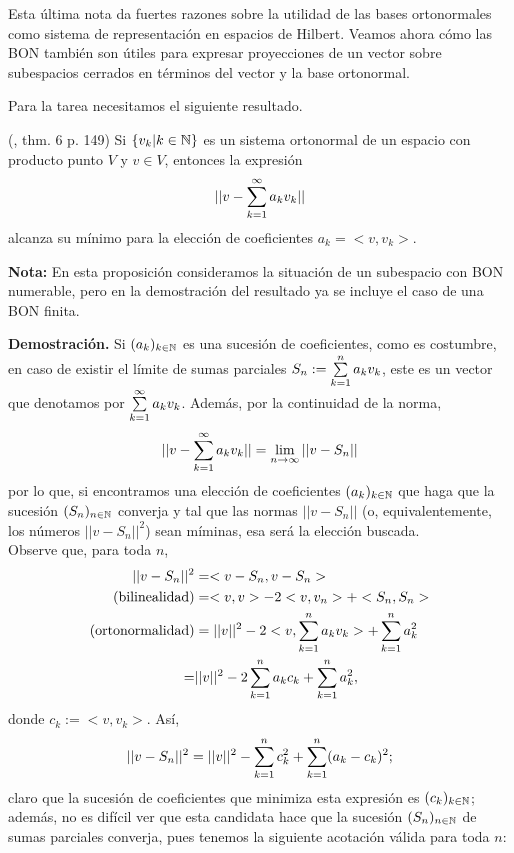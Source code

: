 Esta última nota da fuertes razones sobre la utilidad
de las bases ortonormales como sistema de representación
en espacios de Hilbert. Veamos ahora cómo
las BON también son útiles para expresar proyecciones
de un vector sobre subespacios cerrados en términos del
vector y la base ortonormal. 

Para la tarea necesitamos el siguiente resultado.


\begin{prop} \label{teo: Kol 6, p.149}
(\cite{kolmogorov}, thm. 6 p. 149)
Si $\{ v_{k} |k \in \mathbb{N} \}$ es un sistema
ortonormal de un espacio con producto
punto $V$ y $v \in V$, entonces la expresión
\[
|| v - \sum\limits_{k=1}^{\infty}a_{k}v_{k}  ||
\]
alcanza su mínimo para la elección de coeficientes
$a_{k}= <v , v_{k} > $.
\end{prop}

\noindent
\textbf{Nota:}
En esta proposición consideramos la situación de un subespacio
con BON numerable, pero en la demostración del resultado ya
se incluye el caso de una BON finita.

\noindent
\textbf{Demostración.}
Si $(a_{k})_{k \in \mathbb{N}}$ es una sucesión de coeficientes,
como es costumbre,
en caso de existir el límite de sumas parciales
$S_{n}:= \sum\limits_{k=1}^{n}a_{k}v_{k}$, este es un vector que denotamos
por $\sum\limits_{k=1}^{\infty}a_{k}v_{k}$. Además,
por la continuidad de la norma,
\[
||v - \sum\limits_{k=1}^{\infty}a_{k}v_{k} || = \lim\limits_{n \rightarrow \infty }{||v-S_{n}||}
\]
por lo que, si encontramos una elección de coeficientes $(a_{k})_{k \in \mathbb{N}}$
que haga que
la sucesión $(S_{n})_{n \in \mathbb{N}}$ converja y tal que las normas
$||v-S_{n}||$ (o, equivalentemente, los números $||v-S_{n}||^{2}$)
sean míminas, esa será la elección buscada. \\
Observe que, para toda $n$,
\begin{align*}
||v-S_{n}||^{2} & = <v-S_{n} , v-S_{n} > \\
\text{(bilinealidad)} & =  <v, v > - 2 < v , v_{n} > + <S_{n} , S_{n}  > \\
\text{(ortonormalidad)} & =  ||v||^{2} - 2 < v ,\sum\limits_{k=1}^{n}a_{k}v_{k} > + 
\sum\limits_{k=1}^{n}a_{k}^{2} \\
= & ||v||^{2} - 2\sum\limits_{k=1}^{n}a_{k}c_{k}  + 
\sum\limits_{k=1}^{n}a_{k}^{2},
\end{align*}
donde $c_{k}:= < v , v_{k} >$. Así,
\[
||v-S_{n}||^{2} = ||v||^{2} - \sum\limits_{k=1}^{n}c_{k}^{2}  + 
\sum\limits_{k=1}^{n}(a_{k}-c_{k})^{2};
\]
claro que la sucesión de coeficientes que minimiza
esta expresión es $(c_{k})_{k \in \mathbb{N}}$; además, no es difícil ver
que esta candidata hace que la sucesión $(S_{n})_{n \in \mathbb{N}}$
de sumas parciales converja, pues tenemos la siguiente acotación
válida para toda $n$:

